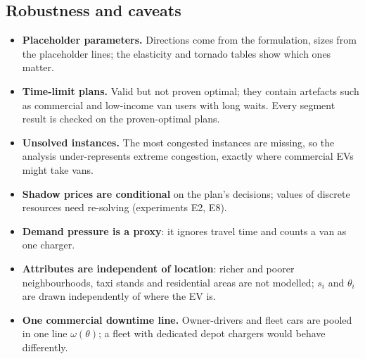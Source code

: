 \subsection{Robustness and caveats}
\label{sec:caveats}
\begin{itemize}
  \item \textbf{Placeholder parameters.} Directions come from the formulation, sizes from the placeholder lines; the elasticity and tornado tables show which ones matter.
  \item \textbf{Time-limit plans.} Valid but not proven optimal; they contain artefacts such as commercial and low-income van users with long waits. Every segment result is checked on the proven-optimal plans.
  \item \textbf{Unsolved instances.} The most congested instances are missing, so the analysis under-represents extreme congestion, exactly where commercial EVs might take vans.
  \item \textbf{Shadow prices are conditional} on the plan's decisions; values of discrete resources need re-solving (experiments E2, E8).
  \item \textbf{Demand pressure is a proxy}: it ignores travel time and counts a van as one charger.
  \item \textbf{Attributes are independent of location}: richer and poorer neighbourhoods, taxi stands and residential areas are not modelled; $s_i$ and $\theta_i$ are drawn independently of where the EV is.
  \item \textbf{One commercial downtime line.} Owner-drivers and fleet cars are pooled in one line $\omega(\theta)$; a fleet with dedicated depot chargers would behave differently.
\end{itemize}

